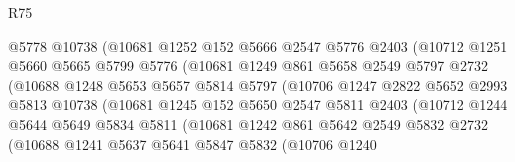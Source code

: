 \begin{lexlean}{R75}
\begin{coremodule}
                          @5778
                          @10738
                          (@10681
                            @1252
                            @152
                            @5666
                            @2547
                            @5776
                            @2403
                            (@10712
                              @1251
                              @5660
                              @5665
                              @5799
                              @5776
                              (@10681
                                @1249
                                @861
                                @5658
                                @2549
                                @5797
                                @2732
                                (@10688
                                  @1248
                                  @5653
                                  @5657
                                  @5814
                                  @5797
                                  (@10706
                                    @1247
                                    @2822
                                    @5652
                                    @2993
                                    @5813
                                    @10738
                                    (@10681
                                      @1245
                                      @152
                                      @5650
                                      @2547
                                      @5811
                                      @2403
                                      (@10712
                                        @1244
                                        @5644
                                        @5649
                                        @5834
                                        @5811
                                        (@10681
                                          @1242
                                          @861
                                          @5642
                                          @2549
                                          @5832
                                          @2732
                                          (@10688
                                            @1241
                                            @5637
                                            @5641
                                            @5847
                                            @5832
                                            (@10706
                                              @1240

\end{coremodule}
\end{lexlean}
